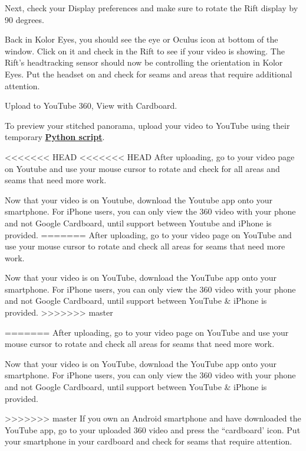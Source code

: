 \begin{fullwidth}

Next, check your Display preferences and make sure to rotate the Rift display by 90 degrees.


Back in Kolor Eyes, you should see the eye or Oculus icon at bottom of the window. Click on it and check in the Rift to see if your video is showing. The Rift’s headtracking sensor should now be controlling the orientation in Kolor Eyes. Put the headset on and check for seams and areas that require additional attention.

\clearpage
{\large Upload to YouTube 360, View with Cardboard. \par}

To preview your stitched panorama, upload your video to YouTube using their temporary \textbf{\href{https://www.youtube.com/watch?v=Z8VlD2rtACA}{Python script}}.

<<<<<<< HEAD
<<<<<<< HEAD
After uploading, go to your video page on Youtube and use your mouse cursor to rotate and check for all areas and seams that need more work.

Now that your video is on Youtube, download the Youtube app onto your smartphone. For iPhone users, you can only view the 360 video with your phone and not Google Cardboard, until support between Youtube and iPhone is provided.
=======
After uploading, go to your video page on YouTube and use your mouse cursor to rotate and check all areas for seams that need more work.

Now that your video is on YouTube, download the YouTube app onto your smartphone. For iPhone users, you can only view the 360 video with your phone and not Google Cardboard, until support between YouTube & iPhone is provided.
>>>>>>> master

=======
After uploading, go to your video page on YouTube and use your mouse cursor to rotate and check all areas for seams that need more work.

Now that your video is on YouTube, download the YouTube app onto your smartphone. For iPhone users, you can only view the 360 video with your phone and not Google Cardboard, until support between YouTube & iPhone is provided.

>>>>>>> master
If you own an Android smartphone and have downloaded the YouTube app, go to your uploaded 360 video and press the “cardboard’ icon. Put your smartphone in your cardboard and check for seams that require attention.


\end{fullwidth}

